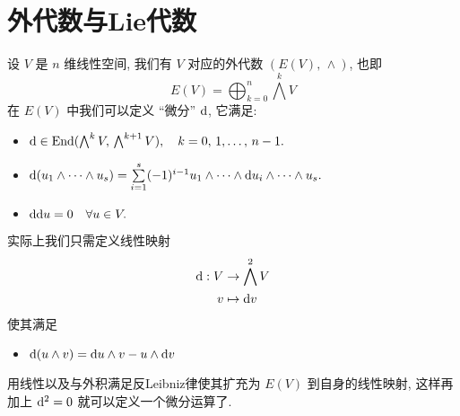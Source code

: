\section{外代数与Lie代数}
    设 $V$ 是 $n$ 维线性空间, 我们有 $V$ 对应的外代数 $(E(V),\,\wedge)$, 也即
    \begin{equation*}
        E(V) = \bigoplus_{k=0}^{n}\bigwedge^{k}V
    \end{equation*}
    在 $E(V)$ 中我们可以定义 “微分” ${\rm d}$, 它满足:
    \begin{itemize}
        \item ${\rm d}\in{\rm End}(\bigwedge^{k}V,\,\bigwedge^{k+1}V),\quad k=0,\,1,\dots,\,n-1.$
        \item ${\rm d}(u_1\wedge\cdots\wedge u_s) = \sum\limits_{i = 1}^{s}(-1)^{i-1}u_1\wedge\cdots\wedge {\rm d} u_i\wedge\cdots\wedge u_s.$
        \item ${\rm d}{\rm d} u = 0\quad \forall u\in V.$
    \end{itemize}
    实际上我们只需定义线性映射
    \begin{align*}
        {\rm d}:V&\rightarrow\bigwedge^2V\\
        v&\mapsto{\rm d} v
    \end{align*}
    使其满足
    \begin{itemize}
        \item ${\rm d}(u\wedge v) = {\rm d} u\wedge v-u\wedge{\rm d} v$
    \end{itemize}
    用线性以及与外积满足反Leibniz律使其扩充为 $E(V)$ 到自身的线性映射, 这样再加上 ${\rm d}^2 = 0$ 就可以定义一个微分运算了.

